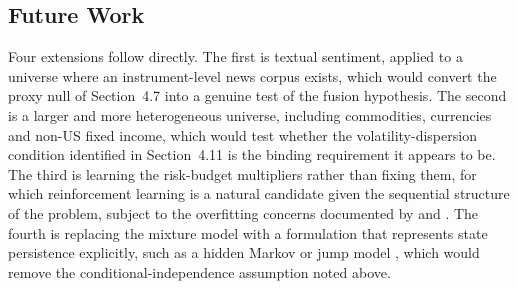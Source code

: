 \subsection{Future Work}

Four extensions follow directly. The first is textual sentiment, applied to a universe
where an instrument-level news corpus exists, which would convert the proxy null of
Section~4.7 into a genuine test of the fusion hypothesis. The second is a larger and
more heterogeneous universe, including commodities, currencies and non-US fixed income,
which would test whether the volatility-dispersion condition identified in
Section~4.11 is the binding requirement it appears to be. The third is learning the
risk-budget multipliers rather than fixing them, for which reinforcement learning is a
natural candidate given the sequential structure of the problem, subject to the
overfitting concerns documented by \citet{harvey15} and \citet{valls26}. The fourth is
replacing the mixture model with a formulation that represents state persistence
explicitly, such as a hidden Markov or jump model \citep{li25}, which would remove the
conditional-independence assumption noted above.
